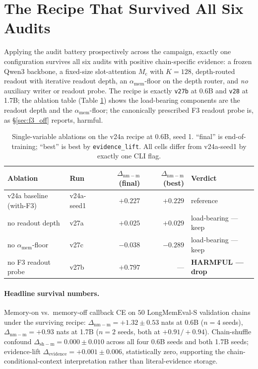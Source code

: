 \documentclass{article}
\newcommand{\Mc}{M_{\mathrm{c}}}
\newcommand{\dnm}{\Delta_{\mathrm{nm-m}}}
\newcommand{\dsh}{\Delta_{\mathrm{sh-m}}}
\newcommand{\elift}{\Delta_{\mathrm{evidence}}}
\newcommand{\amem}{\alpha_{\mathrm{mem}}}
\begin{document}
\section{The Recipe That Survived All Six Audits}
\label{sec:recipe_survived}

Applying the audit battery prospectively across the campaign,
exactly one configuration survives all six audits with positive
chain-specific evidence: a frozen Qwen3 backbone, a fixed-size
slot-attention $\Mc$ with $K=128$, depth-routed readout with
iterative readout depth, an $\amem$-floor on the depth router, and
\emph{no} auxiliary writer or readout probe.  The recipe is
exactly \texttt{v27b} at 0.6B and \texttt{v28} at 1.7B; the
ablation table (Table \ref{tab:ablations}) shows the load-bearing
components are the readout depth and the $\amem$-floor; the
canonically prescribed F3 readout probe is, as
\S\ref{sec:f3_off} reports, harmful.

\begin{table}[t]
\centering
\caption{Single-variable ablations on the v24a recipe at 0.6B,
seed 1.  ``final'' is end-of-training; ``best'' is best by
\texttt{evidence\_lift}.  All cells differ from v24a-seed1 by exactly
one CLI flag.}
\label{tab:ablations}
\small
\begin{tabular}{llrrl}
\toprule
Ablation & Run & $\dnm$ (final) & $\dnm$ (best) & Verdict \\
\midrule
v24a baseline (with-F3) & v24a-seed1 & $+0.227$ & $+0.229$ & reference \\
no readout depth        & v27a       & $+0.025$ & $+0.029$ & load-bearing --- keep \\
no $\amem$-floor        & v27c       & $-0.038$ & $-0.289$ & load-bearing --- keep \\
no F3 readout probe     & v27b       & $+0.797$ & --- & \textbf{HARMFUL --- drop} \\
\bottomrule
\end{tabular}
\end{table}

\paragraph{Headline survival numbers.}  Memory-on vs.\ memory-off
callback CE on $50$ LongMemEval-S validation chains under the
surviving recipe: $\dnm = +1.32 \pm 0.53$ nats at 0.6B ($n=4$
seeds), $\dnm = +0.93$ nats at 1.7B ($n=2$ seeds, both at
$+0.91/+0.94$).  Chain-shuffle confound $\dsh = 0.000 \pm 0.010$
across all four 0.6B seeds and both 1.7B seeds; evidence-lift
$\elift = +0.001 \pm 0.006$, statistically zero, supporting the
chain-conditional-context interpretation rather than literal-evidence
storage.
\end{document}
